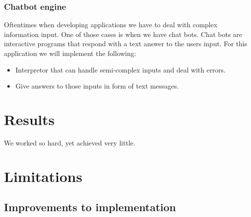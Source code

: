 \documentclass[12pt]{article}
\theoremstyle{definition}
\theoremstyle{theorem}
\begin{document}
\subsubsection{Chatbot engine}

Oftentimes when developing applications we have to deal with complex information
input. One of those cases is when we have chat bots. Chat bots are interactive
programs that respond with a text answer to the users input. For this
application we will implement the following:

\begin{itemize}
    \item Interpretor that can handle semi-complex inputs and deal with errors.
    \item Give answers to those inputs in form of text messages.
\end{itemize}    

\section{Results}\label{results}
We worked so hard, yet achieved very little.

\section{Limitations}\label{limitations}

\subsection{Improvements to implementation}



\end{document}
